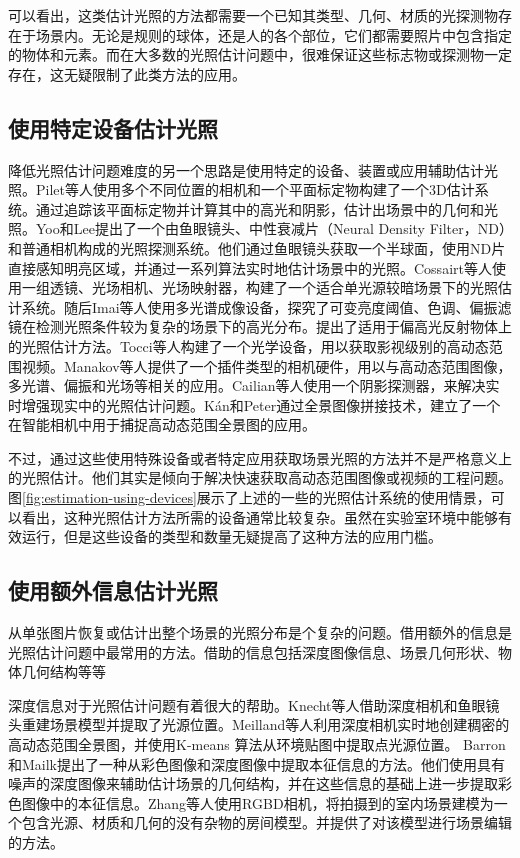 可以看出，这类估计光照的方法都需要一个已知其类型、几何、材质的光探测物存在于场景内。无论是规则的球体，还是人的各个部位，它们都需要照片中包含指定的物体和元素。而在大多数的光照估计问题中，很难保证这些标志物或探测物一定存在，这无疑限制了此类方法的应用。

\subsection{使用特定设备估计光照}
降低光照估计问题难度的另一个思路是使用特定的设备、装置或应用辅助估计光照。Pilet等人\cite{pilet2006all}使用多个不同位置的相机和一个平面标定物构建了一个3D估计系统。通过追踪该平面标定物并计算其中的高光和阴影，估计出场景中的几何和光照。Yoo和Lee\cite{yoo2008real}提出了一个由鱼眼镜头、中性衰减片（Neural Density Filter，ND）和普通相机构成的光照探测系统。他们通过鱼眼镜头获取一个半球面，使用ND片直接感知明亮区域，并通过一系列算法实时地估计场景中的光照。Cossairt\cite{cossairt2008light}等人使用一组透镜、光场相机、光场映射器，构建了一个适合单光源较暗场景下的光照估计系统。随后Imai等人\cite{imai2011estimation}使用多光谱成像设备，探究了可变亮度阈值、色调、偏振滤镜在检测光照条件较为复杂的场景下的高光分布。提出了适用于偏高光反射物体上的光照估计方法。Tocci等人\cite{tocci2011versatile}构建了一个光学设备，用以获取影视级别的高动态范围视频。Manakov等人\cite{manakov2013reconfigurable}提供了一个插件类型的相机硬件，用以与高动态范围图像，多光谱、偏振和光场等相关的应用。Cailian等人\cite{calian2013shading}使用一个阴影探测器，来解决实时增强现实中的光照估计问题。K\'an和Peter\cite{kan2015interactive}通过全景图像拼接技术，建立了一个在智能相机中用于捕捉高动态范围全景图的应用。

不过，通过这些使用特殊设备或者特定应用获取场景光照的方法并不是严格意义上的光照估计。他们其实是倾向于解决快速获取高动态范围图像或视频的工程问题。图\ref{fig:estimation-using-devices}展示了上述的一些的光照估计系统的使用情景，可以看出，这种光照估计方法所需的设备通常比较复杂。虽然在实验室环境中能够有效运行，但是这些设备的类型和数量无疑提高了这种方法的应用门槛。

\subsection{使用额外信息估计光照}
从单张图片恢复或估计出整个场景的光照分布是个复杂的问题。借用额外的信息是光照估计问题中最常用的方法。借助的信息包括深度图像信息、场景几何形状、物体几何结构等等

深度信息对于光照估计问题有着很大的帮助。Knecht等人\cite{knecht2012reciprocal}借助深度相机和鱼眼镜头重建场景模型并提取了光源位置。Meilland等人\cite{meilland20133d}利用深度相机实时地创建稠密的高动态范围全景图，并使用K-means 算法从环境贴图中提取点光源位置。 Barron和Mailk\cite{barron2013intrinsic}提出了一种从彩色图像和深度图像中提取本征信息的方法。他们使用具有噪声的深度图像来辅助估计场景的几何结构，并在这些信息的基础上进一步提取彩色图像中的本征信息。Zhang等人\cite{zhang2016emptying}使用RGBD相机，将拍摄到的室内场景建模为一个包含光源、材质和几何的没有杂物的房间模型。并提供了对该模型进行场景编辑的方法。

